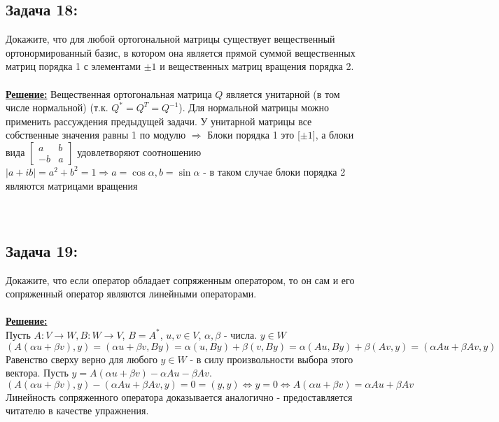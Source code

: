 \documentclass[a4paper,12pt,titlepage,final]{article}
\begin{document}
\subsection*{Задача 18:}
\noindent Докажите, что для любой ортогональной матрицы существует вещественный ортонормированный базис, в котором она является прямой суммой вещественных матриц порядка 1
с элементами $\pm1$ и вещественных матриц вращения порядка 2.\\ \\
\textbf{\underline{Решение:}} Вещественная ортогональная матрица $Q$ является унитарной (в том числе нормальной) (т.к. $Q^* = Q^T = Q^{-1}$).
Для нормальной матрицы можно применить рассуждения предыдущей задачи. У унитарной матрицы все собственные значения равны 1 по модулю $\Rightarrow$ 
Блоки порядка 1 это [$\pm1$], а блоки вида  $\begin{bmatrix} a & b \\ -b & a\end{bmatrix}$ удовлетворяют соотношению
$|a + ib| = a^2 + b^2 = 1 \Rightarrow a = \cos\alpha, b = \sin\alpha$ - в таком случае блоки порядка 2 являются матрицами вращения \blacksquare \\ \\ \\

\subsection*{Задача 19:}
\noindent Докажите, что если оператор обладает сопряженным оператором, то он сам и его сопряженный оператор 
являются линейными операторами.\\ \\
\textbf{\underline{Решение:}} \\
Пусть $A: V \to W, B: W \to V$, $B = A^*$, $u,v \in V$, $\alpha, \beta$ - числа. $y \in W$
$$(A(\alpha u + \beta v), y) = (\alpha u + \beta v, By) = \alpha(u, By) + \beta(v, By) = 
\alpha(Au, By) + \beta(Av, y) = (\alpha Au + \beta Av, y)$$
Равенство сверху верно для любого $y \in W$ - в силу произвольности выбора этого вектора.
Пусть $y = A(\alpha u + \beta v) - \alpha Au - \beta Av$.
$$(A(\alpha u + \beta v), y) - (\alpha Au + \beta Av, y) = 0 = (y, y) \Leftrightarrow y = 0 \Leftrightarrow A(\alpha u + \beta v) = \alpha Au + \beta Av$$
Линейность сопряженного оператора доказывается аналогично - предоставляется читателю в качестве упражнения. \blacksquare \\ \\ \\
\end{document}
